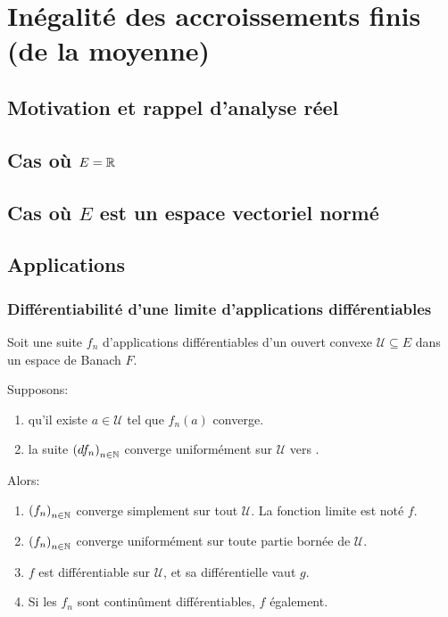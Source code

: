 \chapter{Inégalité des accroissements finis (de la moyenne)}

\section*{Motivation et rappel d'analyse réel}

\section{Cas où $E = \mathbb{R}$}

\section{Cas où $E$ est un espace vectoriel normé}

\section{Applications}

\subsection{Différentiabilité d'une limite d'applications différentiables}

\begin{corollary}
	Soit une suite $f_{n}$ d'applications différentiables d'un ouvert convexe
	$\mathcal{U} \subseteq E$ dans un espace de Banach $F$.
	
	Supposons:
	\begin{enumerate}
		\item qu'il existe $a \in \mathcal{U}$ tel que $f_{n}(a)$ converge.
		\item la suite ${(df_{n})}_{n \in \mathbb{N}}$ converge uniformément sur
			$\mathcal{U}$ vers
			.
	\end{enumerate}

	Alors:

	\begin{enumerate}
		\item ${(f_{n})}_{n \in \mathbb{N}}$ converge simplement sur tout
			$\mathcal{U}$. La fonction limite est noté $f$.
		\item ${(f_{n})}_{n \in \mathbb{N}}$ converge uniformément sur toute
			partie bornée de $\mathcal{U}$.
		\item $f$ est différentiable sur $\mathcal{U}$, et sa différentielle
			vaut $g$.
		\item Si les $f_{n}$ sont continûment différentiables, $f$ également.
	\end{enumerate}
\end{corollary}

